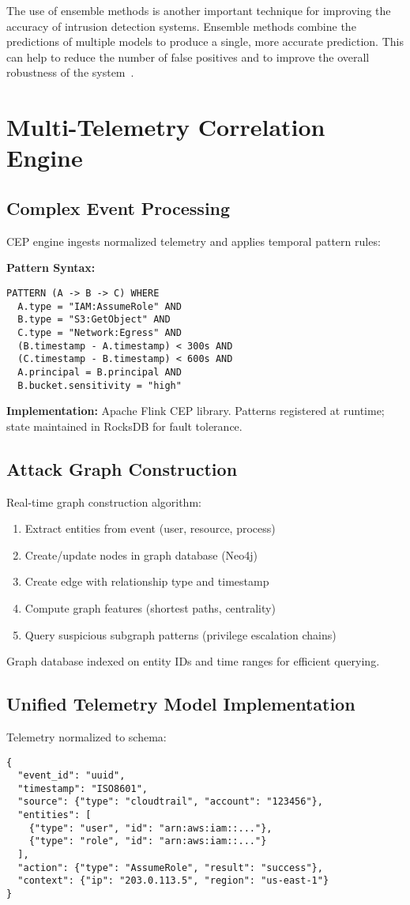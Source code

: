 The use of ensemble methods is another important technique for improving the accuracy of intrusion detection systems. Ensemble methods combine the predictions of multiple models to produce a single, more accurate prediction. This can help to reduce the number of false positives and to improve the overall robustness of the system~\cite{mdpi2024ensemble}.

\section{Multi-Telemetry Correlation Engine}\label{sec:method-correlation}
\subsection{Complex Event Processing}
CEP engine ingests normalized telemetry and applies temporal pattern rules:

\textbf{Pattern Syntax:}
\begin{verbatim}
PATTERN (A -> B -> C) WHERE
  A.type = "IAM:AssumeRole" AND
  B.type = "S3:GetObject" AND
  C.type = "Network:Egress" AND
  (B.timestamp - A.timestamp) < 300s AND
  (C.timestamp - B.timestamp) < 600s AND
  A.principal = B.principal AND
  B.bucket.sensitivity = "high"
\end{verbatim}

\textbf{Implementation:} Apache Flink CEP library. Patterns registered at runtime; state maintained in RocksDB for fault tolerance.

\subsection{Attack Graph Construction}
Real-time graph construction algorithm:
\begin{enumerate}
    \item Extract entities from event (user, resource, process)
    \item Create/update nodes in graph database (Neo4j)
    \item Create edge with relationship type and timestamp
    \item Compute graph features (shortest paths, centrality)
    \item Query suspicious subgraph patterns (privilege escalation chains)
\end{enumerate}

Graph database indexed on entity IDs and time ranges for efficient querying.

\subsection{Unified Telemetry Model Implementation}
Telemetry normalized to schema:
\begin{verbatim}
{
  "event_id": "uuid",
  "timestamp": "ISO8601",
  "source": {"type": "cloudtrail", "account": "123456"},
  "entities": [
    {"type": "user", "id": "arn:aws:iam::..."},
    {"type": "role", "id": "arn:aws:iam::..."}
  ],
  "action": {"type": "AssumeRole", "result": "success"},
  "context": {"ip": "203.0.113.5", "region": "us-east-1"}
}
\end{verbatim}

